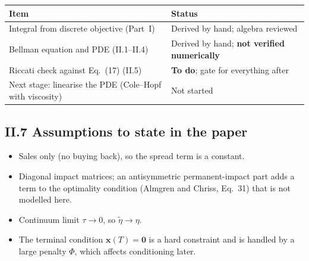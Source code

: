 \documentclass[11pt,a4paper]{article}
\begin{document}
\begin{center}
\begin{tabular}{@{}L{5.2cm}L{8.6cm}@{}}
\toprule
\textbf{Item} & \textbf{Status} \\
\midrule
Integral from discrete objective (Part~I) & Derived by hand; algebra reviewed \\
Bellman equation and PDE (II.1--II.4) & Derived by hand; \textbf{not verified numerically} \\
Riccati check against Eq.~(17) (II.5) & \textbf{To do}; gate for everything after \\
Next stage: linearise the PDE (Cole--Hopf with viscosity) & Not started \\
\bottomrule
\end{tabular}
\end{center}

\subsection*{II.7 Assumptions to state in the paper}

\begin{itemize}[leftmargin=1.5em]
  \item Sales only (no buying back), so the spread term is a constant.
  \item Diagonal impact matrices; an antisymmetric permanent-impact part adds a term
        to the optimality condition (Almgren and Chriss, Eq.~31) that is not
        modelled here.
  \item Continuum limit $\tau\to0$, so $\tilde\eta\to\eta$.
  \item The terminal condition $\mathbf{x}(T)=\mathbf{0}$ is a hard constraint and
        is handled by a large penalty $\Phi$, which affects conditioning later.
\end{itemize}
\end{document}
